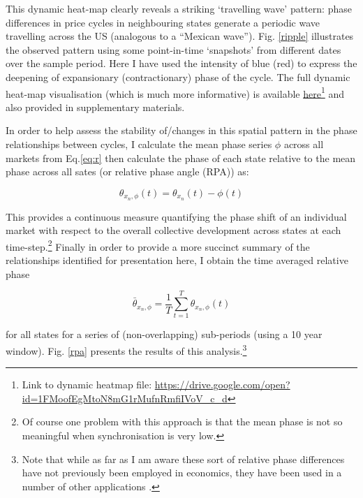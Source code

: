 \documentclass[11pt]{article}
\begin{document}
This dynamic heat-map clearly reveals a striking ‘travelling wave’ pattern: phase differences in price cycles in neighbouring states generate a periodic wave travelling across the US (analogous to a “Mexican wave”). Fig. \ref{ripple} illustrates the observed pattern using some point-in-time ‘snapshots’ from different dates over the sample period. Here I have used the intensity of blue (red) to express the deepening of expansionary (contractionary) phase of the cycle. The full dynamic heat-map visualisation (which is much more informative) is available \href{https://drive.google.com/open?id=1FMoofEgMtoN8mG1rMufnRmfiIVoV_c_d}{here}\footnote{Link to dynamic heatmap file: \url{https://drive.google.com/open?id=1FMoofEgMtoN8mG1rMufnRmfiIVoV_c_d}} and also provided in supplementary materials.

In order to help assess the stability of/changes in this spatial pattern in the phase relationships between cycles, %
I calculate the mean phase series $\phi$ across all markets from Eq.\ref{eq:r} then calculate the phase of each state relative to the mean phase across all sates (or relative phase angle (RPA)) as:

\begin{equation}
 \theta_{x_n,\phi}(t)=\theta_{x_n}(t)-\phi(t)
 \label{eq:rpa}
\end{equation}

This provides a continuous measure quantifying the phase shift of an individual market with respect to the overall collective development across states at each time-step.\footnote{Of course one problem with this approach is that the mean phase is not so meaningful when synchronisation is very low.} %
Finally in order to provide a more succinct summary of the relationships identified for presentation here, I obtain the time averaged relative phase

\begin{equation}
 \bar{\theta}_{x_n,\phi}=\frac{1}{T}\sum_{t=1}^T{\theta_{x_n,\phi}(t)}
 \label{eq:mrpa}
\end{equation}

for all states for a series of  (non-overlapping) sub-periods (using a 10 year window). Fig. \ref{rpa} presents the results of this analysis.\footnote{Note that while as far as I am aware these sort of relative phase differences have not previously been employed in economics,  they have been used in a number of other applications \citep{Richardson2012,Lamb2014,Brouwer2013,Varlet2011}.}
\end{document}

